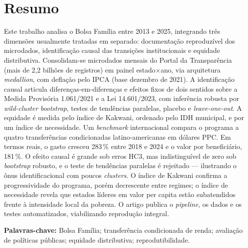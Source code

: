 \documentclass[12pt,a4paper,oneside]{article}
\begin{document}
\section*{Resumo}
\begin{singlespace}\small\noindent
Este trabalho analisa o Bolsa Família entre 2013 e 2025, integrando três dimensões usualmente tratadas em separado: documentação reproduzível dos microdados, identificação causal das transições institucionais e equidade distributiva. Consolidam-se microdados mensais do Portal da Transparência (mais de 2,2 bilhões de registros) em painel estado$\times$ano, via arquitetura \textit{medallion}, com deflação pelo IPCA (base dezembro de 2021). A identificação causal articula diferenças-em-diferenças e efeitos fixos de dois sentidos sobre a Medida Provisória 1.061/2021 e a Lei 14.601/2023, com inferência robusta por \textit{wild-cluster bootstrap}, testes de tendências paralelas, placebo e \textit{leave-one-out}. A equidade é medida pelo índice de Kakwani, ordenado pelo IDH municipal, e por um índice de necessidade. Um \textit{benchmark} internacional compara o programa a quatro transferências condicionadas latino-americanas em dólares PPC. Em termos reais, o gasto cresceu 283\,\% entre 2018 e 2024 e o valor por beneficiário, 181\,\%. O efeito causal é grande sob erros HC3, mas indistinguível de zero sob \textit{bootstrap} robusto, e o teste de tendências paralelas é rejeitado --- ilustrando o ônus identificacional com poucos \textit{clusters}. O índice de Kakwani confirma a progressividade do programa, porém decrescente entre regimes; o índice de necessidade revela que estados líderes em valor per capita estão subatendidos frente à intensidade local da pobreza. O artigo publica o \textit{pipeline}, os dados e os testes automatizados, viabilizando reprodução integral.

\vspace{6pt}\noindent\textbf{Palavras-chave:} Bolsa Família; transferência condicionada de renda; avaliação de políticas públicas; equidade distributiva; reprodutibilidade.
\end{singlespace}

\vspace{6pt}
\end{document}
